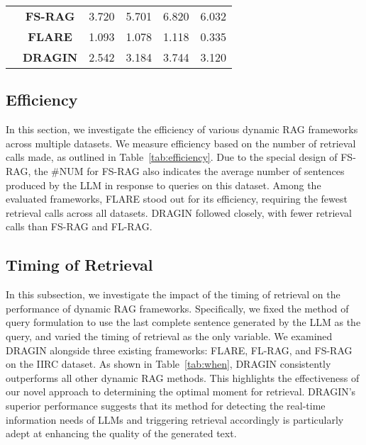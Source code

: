 \begin{table}[t]
\begin{tabular}{lccccc}
                                            &\textbf{FS-RAG} & 3.720                     & 5.701             & 6.820& 6.032\\
                                            &\textbf{FLARE}  & 1.093                    & 1.078             & 1.118               & 0.335\\
                                            
                                            &\textbf{DRAGIN} & 2.542                    & 3.184             & 3.744               & 3.120\\
                                          \toprule
\end{tabular}
\end{table}

\subsection{Efficiency}
\label{sec:efficiency}

In this section, we investigate the efficiency of various dynamic RAG frameworks across multiple datasets. We measure efficiency based on the number of retrieval calls made, as outlined in Table~\ref{tab:efficiency}. Due to the special design of FS-RAG, the \#NUM for FS-RAG also indicates the average number of sentences produced by the LLM in response to queries on this dataset. 
Among the evaluated frameworks, FLARE stood out for its efficiency, requiring the fewest retrieval calls across all datasets. DRAGIN followed closely, with fewer retrieval calls than FS-RAG and FL-RAG. 

\subsection{Timing of Retrieval}
\label{sec:when}

In this subsection, we investigate the impact of the timing of retrieval on the performance of dynamic RAG frameworks. Specifically, we fixed the method of query formulation to use the last complete sentence generated by the LLM as the query, and varied the timing of retrieval as the only variable. We examined DRAGIN alongside three existing frameworks: FLARE, FL-RAG, and FS-RAG on the IIRC dataset.
As shown in Table~\ref{tab:when}, DRAGIN consistently outperforms all other dynamic RAG methods. This highlights the effectiveness of our novel approach to determining the optimal moment for retrieval. DRAGIN's superior performance suggests that its method for detecting the real-time information needs of LLMs and triggering retrieval accordingly is particularly adept at enhancing the quality of the generated text.

